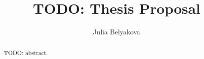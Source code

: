 \title{TODO: Thesis Proposal}

\author{Julia Belyakova}

\date{}

\maketitle


\begin{abstract}
  TODO: abstract.
\end{abstract}
